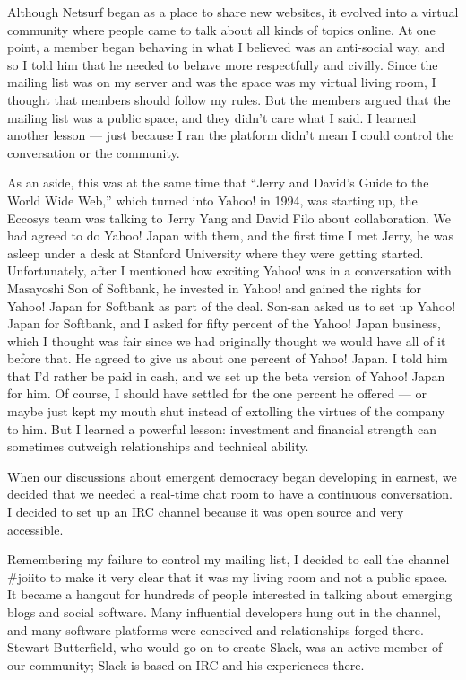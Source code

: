 Although Netsurf began as a place to share new websites, it evolved into a virtual community where people came to talk about all kinds of topics online. At one point, a member began behaving in what I believed was an anti-social way, and so I told him that he needed to behave more respectfully and civilly. Since the mailing list was on my server and was the space was my virtual living room, I thought that members should follow my rules. But the members argued that the mailing list was a public space, and they didn't care what I said. I learned another lesson --- just because I ran the platform didn't mean I could control the conversation or the community.

As an aside, this was at the same time that ``Jerry and David's Guide to the World Wide Web,'' which turned into Yahoo! in 1994, was starting up, the Eccosys team was talking to Jerry Yang and David Filo about collaboration. We had agreed to do Yahoo! Japan with them, and the first time I met Jerry, he was asleep under a desk at Stanford University where they were getting started. Unfortunately, after I mentioned how exciting Yahoo! was in a conversation with Masayoshi Son of Softbank, he invested in Yahoo! and gained the rights for Yahoo! Japan for Softbank as part of the deal. Son-san asked us to set up Yahoo! Japan for Softbank, and I asked for fifty percent of the Yahoo! Japan business, which I thought was fair since we had originally thought we would have all of it before that. He agreed to give us about one percent of Yahoo! Japan. I told him that I'd rather be paid in cash, and we set up the beta version of Yahoo! Japan for him. Of course, I should have settled for the one percent he offered --- or maybe just kept my mouth shut instead of extolling the virtues of the company to him. But I learned a powerful lesson: investment and financial strength can sometimes outweigh relationships and technical ability.

When our discussions about emergent democracy began developing in earnest, we decided that we needed a real-time chat room to have a continuous conversation. I decided to set up an \ac{IRC} channel because it was open source and very accessible.

Remembering my failure to control my mailing list, I decided to call the channel \#joiito to make it very clear that it was my living room and not a public space. It became a hangout for hundreds of people interested in talking about emerging blogs and social software. Many influential developers hung out in the channel, and many software platforms were conceived and relationships forged there. Stewart Butterfield, who would go on to create Slack, was an active member of our community; Slack is based on \ac{IRC} and his experiences there.

